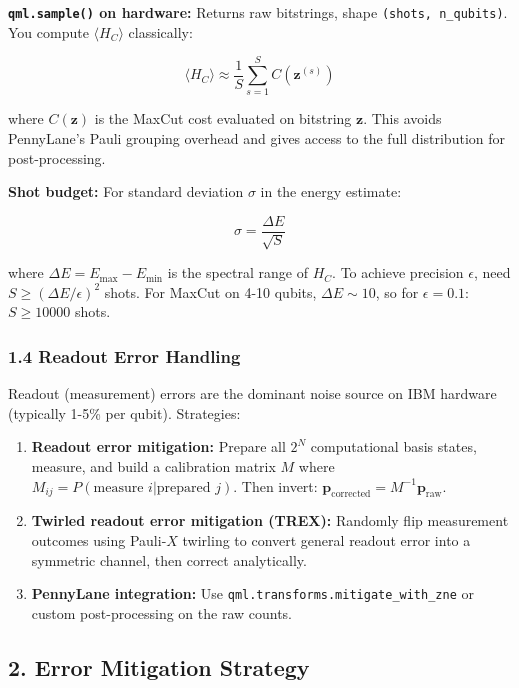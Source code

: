 \documentclass[
  11pt,
]{report}
\begin{document}
\textbf{\texttt{qml.sample()} on hardware:} Returns raw bitstrings,
shape \texttt{(shots,\ n\_qubits)}. You compute \(\langle H_C \rangle\)
classically:

\[\langle H_C \rangle \approx \frac{1}{S}\sum_{s=1}^{S} C(\mathbf{z}^{(s)})\]

where \(C(\mathbf{z})\) is the MaxCut cost evaluated on bitstring
\(\mathbf{z}\). This avoids PennyLane's Pauli grouping overhead and
gives access to the full distribution for post-processing.

\textbf{Shot budget:} For standard deviation \(\sigma\) in the energy
estimate:

\[\sigma = \frac{\Delta E}{\sqrt{S}}\]

where \(\Delta E = E_{\max} - E_{\min}\) is the spectral range of
\(H_C\). To achieve precision \(\epsilon\), need
\(S \geq (\Delta E / \epsilon)^2\) shots. For MaxCut on 4-10 qubits,
\(\Delta E \sim 10\), so for \(\epsilon = 0.1\): \(S \geq 10000\) shots.

\subsubsection{1.4 Readout Error Handling}\label{readout-error-handling}

Readout (measurement) errors are the dominant noise source on IBM
hardware (typically 1-5\% per qubit). Strategies:

\begin{enumerate}
\def\labelenumi{\arabic{enumi}.}
\item
  \textbf{Readout error mitigation:} Prepare all \(2^N\) computational
  basis states, measure, and build a calibration matrix \(M\) where
  \(M_{ij} = P(\text{measure } i | \text{prepared } j)\). Then invert:
  \(\mathbf{p}_{\text{corrected}} = M^{-1} \mathbf{p}_{\text{raw}}\).
\item
  \textbf{Twirled readout error mitigation (TREX):} Randomly flip
  measurement outcomes using Pauli-\(X\) twirling to convert general
  readout error into a symmetric channel, then correct analytically.
\item
  \textbf{PennyLane integration:} Use
  \texttt{qml.transforms.mitigate\_with\_zne} or custom post-processing
  on the raw counts.
\end{enumerate}

\subsection{2. Error Mitigation
Strategy}\label{error-mitigation-strategy}
\end{document}
